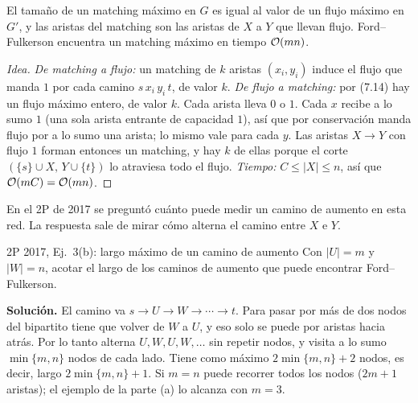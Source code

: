 \begin{center}
\end{center}

\begin{resultado}[(7.37) y (7.38)]
El tamaño de un matching máximo en $G$ es igual al valor de un flujo máximo en $G'$, y las aristas del matching son las aristas de $X$ a $Y$ que llevan flujo. Ford–Fulkerson encuentra un matching máximo en tiempo $\mathcal{O}(mn)$.
\end{resultado}

\begin{proof}[Idea]
\emph{De matching a flujo:} un matching de $k$ aristas $(x_i,y_i)$ induce el flujo que manda $1$ por cada camino $s\,x_i\,y_i\,t$, de valor $k$. \emph{De flujo a matching:} por (7.14) hay un flujo máximo entero, de valor $k$. Cada arista lleva $0$ o $1$. Cada $x$ recibe a lo sumo $1$ (una sola arista entrante de capacidad $1$), así que por conservación manda flujo por a lo sumo una arista; lo mismo vale para cada $y$. Las aristas $X\to Y$ con flujo $1$ forman entonces un matching, y hay $k$ de ellas porque el corte $(\{s\}\cup X,\,Y\cup\{t\})$ lo atraviesa todo el flujo. \emph{Tiempo:} $C\le|X|\le n$, así que $\mathcal{O}(mC)=\mathcal{O}(mn)$.
\end{proof}

En el 2P de 2017 se preguntó cuánto puede medir un camino de aumento en esta red. La respuesta sale de mirar cómo alterna el camino entre $X$ e $Y$.

\begin{problema}{2P 2017, Ej.~3(b): largo máximo de un camino de aumento}
Con $|U|=m$ y $|W|=n$, acotar el largo de los caminos de aumento que puede encontrar Ford–Fulkerson.

\smallskip
\textbf{Solución.} El camino va $s\to U\to W\to\cdots\to t$. Para pasar por más de dos nodos del bipartito tiene que volver de $W$ a $U$, y eso solo se puede por aristas hacia atrás. Por lo tanto alterna $U,W,U,W,\dots$ sin repetir nodos, y visita a lo sumo $\min\{m,n\}$ nodos de cada lado. Tiene como máximo $2\min\{m,n\}+2$ nodos, es decir, largo $2\min\{m,n\}+1$. Si $m=n$ puede recorrer todos los nodos ($2m+1$ aristas); el ejemplo de la parte (a) lo alcanza con $m=3$.
\end{problema}

